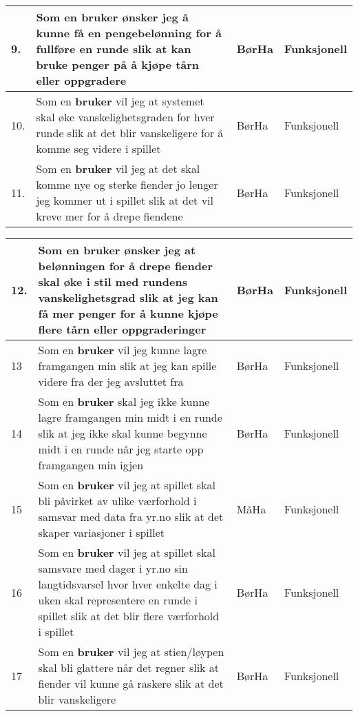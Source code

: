 \documentclass[norsk,a4paper]{article}
\begin{document}
\begin{center}
\begin{tabular}{ | p{} | p{6cm} | p{2cm} | p{3cm} |}
    9. & Som en \textbf{bruker} ønsker jeg å kunne få en pengebelønning for å fullføre en runde slik at kan bruke penger på å kjøpe tårn eller oppgradere & BørHa & Funksjonell \\ \hline
     
    10. & Som en \textbf{bruker} vil jeg at systemet skal øke vanskelighetsgraden for hver runde slik at det blir vanskeligere for å komme seg videre i spillet & BørHa & Funksjonell \\ \hline
   
    11. & Som en \textbf{bruker} vil jeg at det skal komme nye og sterke fiender jo lenger jeg kommer ut i spillet slik at det vil kreve mer for å drepe fiendene & BørHa & Funksjonell
    \\ \hline
    
    
\end{tabular}

\begin{tabular}{ | p{} | p{6cm} | p{2cm} | p{3cm} |}
    \hline   
     
    12. & Som en \textbf{bruker} ønsker jeg at belønningen for å drepe fiender skal øke i stil med rundens vanskelighetsgrad slik at jeg kan få mer penger for å kunne kjøpe flere tårn eller oppgraderinger & BørHa & Funksjonell \\
    \hline
    
    13 & Som en \textbf{bruker} vil jeg kunne lagre framgangen min slik at jeg kan spille videre fra der jeg avsluttet fra & BørHa & Funksjonell \\ \hline
      
    14 & Som en \textbf{bruker} skal jeg ikke kunne lagre framgangen min midt i en runde slik at jeg ikke skal kunne begynne midt i en runde når jeg starte opp framgangen min igjen  & BørHa & Funksjonell \\ \hline
   
    15 & Som en \textbf{bruker} vil jeg at spillet skal bli påvirket av ulike værforhold i samsvar med data fra yr.no slik at det skaper variasjoner i spillet  & MåHa & Funksjonell \\ \hline
    
    16 & Som en \textbf{bruker} vil jeg at spillet skal samsvare med dager i yr.no sin langtidsvarsel hvor hver enkelte dag i uken skal representere en runde i spillet slik at det blir flere værforhold i spillet & BørHa & Funksjonell \\ \hline
    
    17 & Som en \textbf{bruker} vil jeg at stien/løypen skal bli glattere når det regner slik at fiender vil kunne gå raskere slik at det blir vanskeligere & BørHa & Funksjonell \\ \hline
    

\end{tabular}
\end{center}
\end{document}
